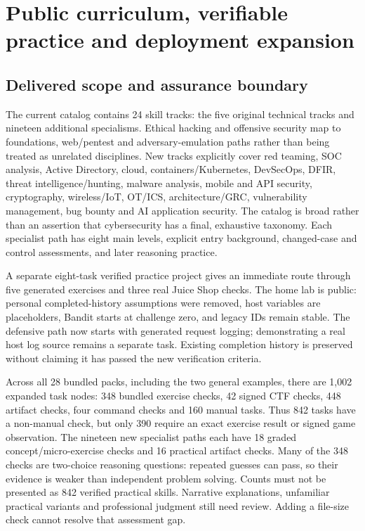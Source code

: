\section{Public curriculum, verifiable practice and deployment expansion}
\subsection{Delivered scope and assurance boundary}
The current catalog contains 24 skill tracks: the five original technical tracks
and nineteen additional specialisms. Ethical hacking and offensive security map to
foundations, web/pentest and adversary-emulation paths rather than being treated as
unrelated disciplines. New tracks explicitly cover red teaming, SOC analysis, Active
Directory, cloud, containers/Kubernetes, DevSecOps, DFIR, threat intelligence/hunting,
malware analysis, mobile and API security, cryptography, wireless/IoT, OT/ICS,
architecture/GRC, vulnerability management, bug bounty and AI application security.
The catalog is broad rather than an assertion that cybersecurity has a final,
exhaustive taxonomy. Each specialist path has eight main levels, explicit entry
background, changed-case and control assessments, and later reasoning practice.

A separate eight-task verified practice project gives an immediate route through
five generated exercises and three real Juice Shop checks. The home lab is public:
personal completed-history assumptions were removed, host variables are placeholders,
Bandit starts at challenge zero, and legacy IDs remain stable. The defensive path
now starts with generated request logging; demonstrating a real host log source
remains a separate task. Existing completion history is preserved without claiming
it has passed the new verification criteria.

Across all 28 bundled packs, including the two general examples, there are 1,002
expanded task nodes: 348 bundled exercise checks, 42 signed CTF checks, 448 artifact
checks, four command checks and 160 manual tasks. Thus 842 tasks have a non-manual
check, but only 390 require an exact exercise result or signed game observation.
The nineteen new specialist paths each have 18 graded concept/micro-exercise checks
and 16 practical artifact checks. Many of the 348 checks are two-choice reasoning
questions: repeated guesses can pass, so their evidence is weaker than independent
problem solving. Counts must not be presented as 842 verified practical skills.
Narrative explanations, unfamiliar practical variants and professional judgment
still need review. Adding a file-size check cannot resolve that assessment gap.

